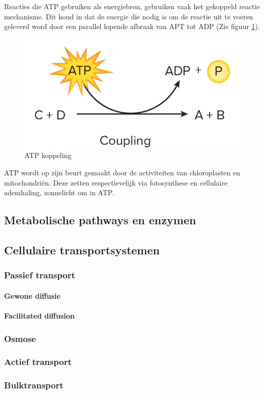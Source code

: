 \documentclass[a4paper,kul]{kulakarticle} %
\begin{document}
Reacties die ATP gebruiken als energiebron, gebruiken vaak het gekoppeld reactie mechanisme. Dit houd in dat de energie die nodig is om de reactie uit te voeren geleverd word door een parallel lopende afbraak van APT tot ADP (Zie figuur \ref{fig:atpcoupeling}). 
\begin{figure}[h]
	\centering
	\includegraphics[width=0.7\linewidth]{ATPCoupeling}
	\caption[ATP Koppeling]{ATP koppeling}
	\label{fig:atpcoupeling}
\end{figure}
ATP wordt op zijn beurt gemaakt door de activiteiten van chloroplasten en mitochondriën. Deze zetten respectievelijk via fotosynthese en cellulaire ademhaling, zonnelicht om in ATP. 
\subsection{Metabolische pathways en enzymen}
\subsection{Cellulaire transportsystemen}
\subsubsection{Passief transport}
\paragraph{Gewone diffusie}
\paragraph{Facilitated diffusion}
\subsubsection{Osmose}
\subsubsection{Actief transport}
\subsubsection{Bulktransport}
\end{document}
